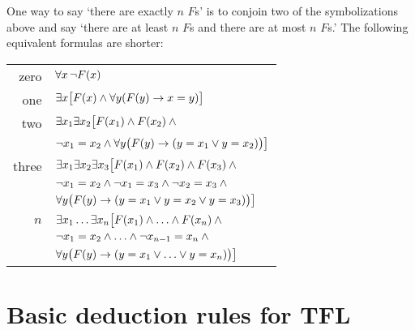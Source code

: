 One way to say `there are exactly $n$ $F$s' is to conjoin two of the symbolizations above and say `there are at least $n$ $F$s and there are at most $n$ $F$s.' The following equivalent formulas are shorter:
\begin{tabular*}{\textwidth}{rl}
zero & $\forall x\,\neg \mathord{F}(x)$\\
one & $\exists x\bigl[\mathord{F}(x) \wedge \forall y(\mathord{F}(y) \rightarrow x = y)\bigr]$\\
two & $\exists x_1\exists x_2\bigl[\mathord{F}(x_1) \wedge \mathord{F}(x_2) \wedge {}$\\
& $\neg x_1 = x_2 \wedge \forall y\bigl(\mathord{F}(y) \rightarrow (y= x_1 \vee y = x_2)\bigr) \bigr]$\\
three & $\exists x_1\exists x_2\exists x_3\bigl[\mathord{F}(x_1) \wedge \mathord{F}(x_2) \wedge \mathord{F}(x_3) \wedge {}$\\
& $\neg x_1 =  x_2 \wedge \neg  x_1 = x_3 \wedge \neg x_2 = x_3 \wedge {}$\\
& $\forall y\bigl(\mathord{F}(y) \rightarrow (y = x_1 \vee y = x_2 \vee y =  x_3)\bigr) \bigr]$\\
$n$ & $\exists x_1\ldots\exists x_n\bigl[\mathord{F}(x_1) \wedge\ldots\wedge \mathord{F}(x_n)  \wedge {}$\\
&$ \neg x_1 = x_2 \wedge\ldots\wedge \neg x_{n-1}= x_n \wedge \phantom{.}$\\
& $\forall y\bigl(\mathord{F}(y) \rightarrow (y= x_1 \vee \ldots \vee y= x_n)\bigr)\bigr]$ 
\end{tabular*}


\label{ProofRules}
\newpage\section{Basic deduction rules for TFL}
\renewenvironment{fitchproof}
	{\noindent\par\noindent\small$\begin{nd}}
	{\end{nd}$\noindent\normalsize\ignorespacesafterend}

